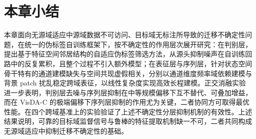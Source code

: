 \FloatBarrier


\section{本章小结}

本章面向无源域适应中源域数据不可访问、目标域无标注所导致的迁移不确定性问题，在统一的伪标签自训练框架下，按不确定性的作用层次展开研究：在判别层，提出基于特征空间邻居结构的自适应伪标签筛选方法，从源头抑制噪声在自训练回路中的反复累积，且整个过程不引入额外模型；在表征层与序列层，针对状态空间骨干特有的通道建模缺失与空间共现虚假相关，分别以通道维度频率域依赖建模与背景 patch 扰乱稳定跨域表征，以线性复杂度实现高效长程建模。正交消融实验进一步表明，判别层去噪与序列层抑制在中等规模偏移下互不替代、可叠加增益，而在 VisDA-C 的极端偏移下序列层抑制的作用尤为关键，二者协同方可取得最优性能。在四个跨域基准上的实验验证了上述不确定性分层抑制机制的有效性。上述结果说明，可靠的目标域监督信号与鲁棒的特征提取机制缺一不可，二者共同构成无源域适应中抑制迁移不确定性的基础。

